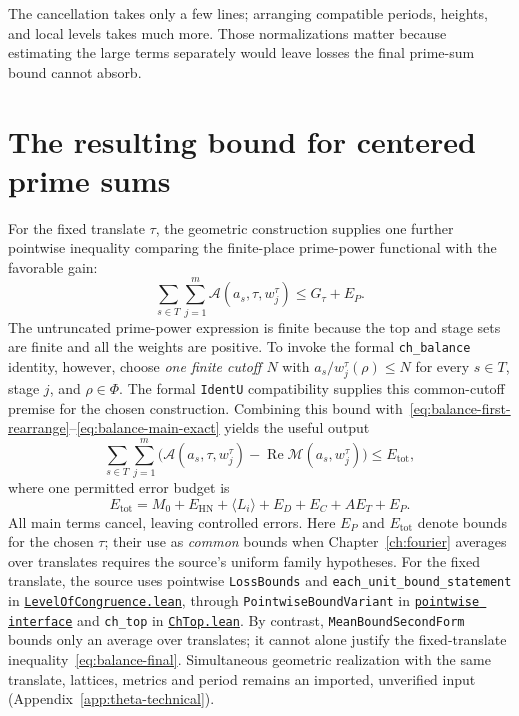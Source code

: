 \documentclass[11pt,openany,oneside]{scrbook}
\theoremstyle{definition}
\theoremstyle{remark}
\newcommand{\Rea}{\operatorname{Re}}
\newcommand{\baseurl}{https://github.com/CocoSgt/riemann-hypothesis-lean/blob/7cbf7a0c32fca1badf05931879a37c3f8a2b03b4/}
\newcommand{\sourcefile}[2]{\href{\baseurl#1}{\texttt{#2}}}
\begin{document}
The cancellation takes only a few lines; arranging compatible periods, heights, and local levels takes much more. Those normalizations matter because estimating the large terms separately would leave losses the final prime-sum bound cannot absorb.

\section{The resulting bound for centered prime sums}\label{sec:balance-error}

For the fixed translate $\tau$, the geometric construction supplies one further pointwise inequality comparing the finite-place prime-power functional with the favorable gain:
\begin{equation}\label{eq:balance-finite-bound}
\sum_{s\in T}\sum_{j=1}^m\mathcal A(a_s,\tau,w_j^\tau)\le G_\tau+E_P.
\end{equation}
The untruncated prime-power expression is finite because the top and stage sets are finite and all the weights are positive. To invoke the formal \texttt{ch\_balance} identity, however, choose \emph{one finite cutoff $N$} with $a_s/w_j^\tau(\rho)\le N$ for every $s\in T$, stage $j$, and $\rho\in\Phi$. The formal \texttt{IdentU} compatibility supplies this common-cutoff premise for the chosen construction.
Combining this bound with~\eqref{eq:balance-first-rearrange}--\eqref{eq:balance-main-exact} yields the useful output
\begin{equation}\label{eq:balance-final}
\boxed{\displaystyle
\sum_{s\in T}\sum_{j=1}^m
\bigl(\mathcal A(a_s,\tau,w_j^\tau)-\Rea\mathcal M(a_s,w_j^\tau)\bigr)
\le E_{\mathrm{tot}},}
\end{equation}
where one permitted error budget is
\begin{equation}\label{eq:balance-errors}
E_{\mathrm{tot}}=M_0+E_{\mathrm{HN}}+\langle L_i\rangle
+E_D+E_C+AE_T+E_P.
\end{equation}
All main terms cancel, leaving controlled errors. Here $E_P$ and $E_{\mathrm{tot}}$ denote bounds for the chosen $\tau$; their use as \emph{common} bounds when Chapter~\ref{ch:fourier} averages over translates requires the source's uniform family hypotheses. For the fixed translate, the source uses pointwise \texttt{LossBounds} and \texttt{each\_unit\_bound\_statement} in \sourcefile{src/Formalism/SizeWindowBrackets/ChainSlopeWindows/LevelOfCongruence.lean}{LevelOfCongruence.lean}, through \texttt{PointwiseBoundVariant} in \sourcefile{src/Formalism/SizeWindowBrackets/QuotientSlopeBoundsWith.lean}{pointwise interface} and \texttt{ch\_top} in \sourcefile{src/Development/AutomorphicArithmetic/DedekindLFunctions/LandauTheorems/ChTop.lean}{ChTop.lean}.  By contrast, \texttt{MeanBoundSecondForm} bounds only an average over translates; it cannot alone justify the fixed-translate inequality~\eqref{eq:balance-final}.  Simultaneous geometric realization with the same translate, lattices, metrics and period remains an imported, unverified input (Appendix~\ref{app:theta-technical}).
\end{document}
